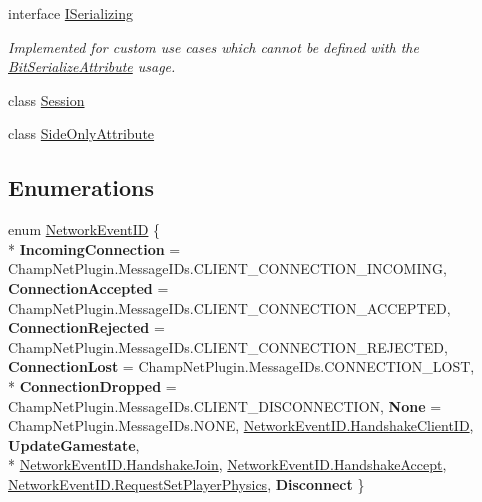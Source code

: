 \begin{DoxyCompactItemize}
interface \hyperlink{interface_skyrates_1_1_common_1_1_network_1_1_i_serializing}{I\-Serializing}
\begin{DoxyCompactList}\small\item\em Implemented for custom use cases which cannot be defined with the \hyperlink{class_skyrates_1_1_common_1_1_network_1_1_bit_serialize_attribute}{Bit\-Serialize\-Attribute} usage. \end{DoxyCompactList}\item 
class \hyperlink{class_skyrates_1_1_common_1_1_network_1_1_session}{Session}
\item 
class \hyperlink{class_skyrates_1_1_common_1_1_network_1_1_side_only_attribute}{Side\-Only\-Attribute}
\end{DoxyCompactItemize}
\subsection*{Enumerations}
\begin{DoxyCompactItemize}
\item 
enum \hyperlink{namespace_skyrates_1_1_common_1_1_network_a90fc6faa44c44b4284114e861d3e761a}{Network\-Event\-I\-D} \{ \\*
{\bfseries Incoming\-Connection} = Champ\-Net\-Plugin.\-Message\-I\-Ds.\-C\-L\-I\-E\-N\-T\-\_\-\-C\-O\-N\-N\-E\-C\-T\-I\-O\-N\-\_\-\-I\-N\-C\-O\-M\-I\-N\-G, 
{\bfseries Connection\-Accepted} = Champ\-Net\-Plugin.\-Message\-I\-Ds.\-C\-L\-I\-E\-N\-T\-\_\-\-C\-O\-N\-N\-E\-C\-T\-I\-O\-N\-\_\-\-A\-C\-C\-E\-P\-T\-E\-D, 
{\bfseries Connection\-Rejected} = Champ\-Net\-Plugin.\-Message\-I\-Ds.\-C\-L\-I\-E\-N\-T\-\_\-\-C\-O\-N\-N\-E\-C\-T\-I\-O\-N\-\_\-\-R\-E\-J\-E\-C\-T\-E\-D, 
{\bfseries Connection\-Lost} = Champ\-Net\-Plugin.\-Message\-I\-Ds.\-C\-O\-N\-N\-E\-C\-T\-I\-O\-N\-\_\-\-L\-O\-S\-T, 
\\*
{\bfseries Connection\-Dropped} = Champ\-Net\-Plugin.\-Message\-I\-Ds.\-C\-L\-I\-E\-N\-T\-\_\-\-D\-I\-S\-C\-O\-N\-N\-E\-C\-T\-I\-O\-N, 
{\bfseries None} = Champ\-Net\-Plugin.\-Message\-I\-Ds.\-N\-O\-N\-E, 
\hyperlink{namespace_skyrates_1_1_common_1_1_network_a90fc6faa44c44b4284114e861d3e761aa908d5d0d1dcdac6a031195157436dbc3}{Network\-Event\-I\-D.\-Handshake\-Client\-I\-D}, 
{\bfseries Update\-Gamestate}, 
\\*
\hyperlink{namespace_skyrates_1_1_common_1_1_network_a90fc6faa44c44b4284114e861d3e761aae1ed8fdcd01caace5506395496004e93}{Network\-Event\-I\-D.\-Handshake\-Join}, 
\hyperlink{namespace_skyrates_1_1_common_1_1_network_a90fc6faa44c44b4284114e861d3e761aa687268a9c39eb0452e4bf727ebc788f0}{Network\-Event\-I\-D.\-Handshake\-Accept}, 
\hyperlink{namespace_skyrates_1_1_common_1_1_network_a90fc6faa44c44b4284114e861d3e761aa4580f9f0cb71411e3ef1bf8023965089}{Network\-Event\-I\-D.\-Request\-Set\-Player\-Physics}, 
{\bfseries Disconnect}
 \}
\end{DoxyCompactItemize}
